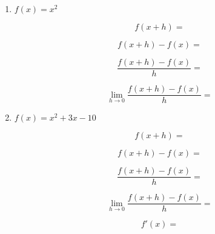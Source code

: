 \documentclass[14pt]{extarticle}
\begin{document}
\begin{enumerate}
	\item $f(x) = x^2$
	\begin{fleqn}\begin{equation*}f(x+h) =\end{equation*} \end{fleqn}
	\vspace{1cm}
	\begin{fleqn}\begin{equation*}f(x+h) - f(x) =\end{equation*} \end{fleqn}
	\vspace{1cm}
	\begin{fleqn}\begin{equation*}\frac{f(x+h) - f(x)}{h} =\end{equation*} \end{fleqn}
	\vspace{1cm}
	\begin{fleqn}\begin{equation*}\lim_{h\to 0}\frac{f(x+h) - f(x)}{h} =\end{equation*} \end{fleqn}
	\vspace{1cm}
	
	\item $f(x) = x^2 + 3x - 10$
	\begin{fleqn}\begin{equation*}f(x+h) =\end{equation*} \end{fleqn}
	\vspace{1.5cm}
	\begin{fleqn}\begin{equation*}f(x+h) - f(x) =\end{equation*} \end{fleqn}
	\vspace{1.5cm}
	\begin{fleqn}\begin{equation*}\frac{f(x+h) - f(x)}{h} =\end{equation*} \end{fleqn}
	\vspace{1.5cm}
	\begin{fleqn}\begin{equation*}\lim_{h\to 0}\frac{f(x+h) - f(x)}{h} =\end{equation*} \end{fleqn}
	\vspace{1.5cm}
	\begin{fleqn}\begin{equation*}f'(x) =\end{equation*} \end{fleqn}


\end{enumerate}
\end{document}
